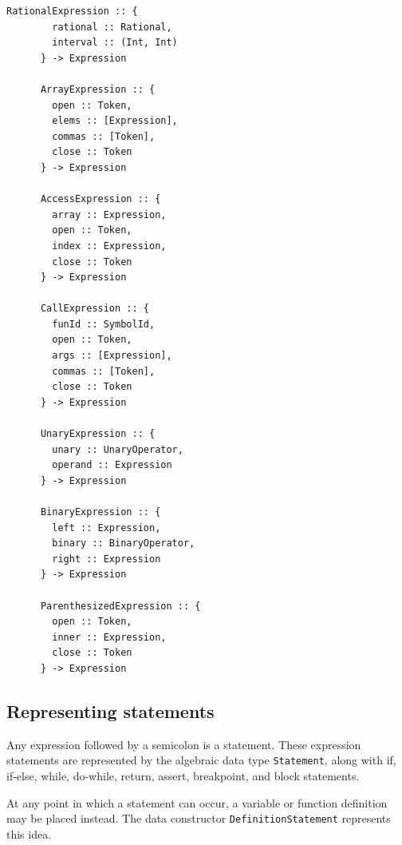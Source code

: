\documentclass[UdineBachThesis,american,11pt]{PhdThesis}
\begin{document}
  \begin{Verbatim}[gobble=4,fontsize=\small]
      RationalExpression :: {
        rational :: Rational,
        interval :: (Int, Int)
      } -> Expression

      ArrayExpression :: {
        open :: Token,
        elems :: [Expression],
        commas :: [Token],
        close :: Token
      } -> Expression

      AccessExpression :: {
        array :: Expression,
        open :: Token,
        index :: Expression,
        close :: Token
      } -> Expression

      CallExpression :: {
        funId :: SymbolId,
        open :: Token,
        args :: [Expression],
        commas :: [Token],
        close :: Token
      } -> Expression

      UnaryExpression :: {
        unary :: UnaryOperator,
        operand :: Expression
      } -> Expression

      BinaryExpression :: {
        left :: Expression,
        binary :: BinaryOperator,
        right :: Expression
      } -> Expression

      ParenthesizedExpression :: {
        open :: Token,
        inner :: Expression,
        close :: Token
      } -> Expression
  \end{Verbatim}

  \subsection{Representing statements}

  Any expression followed by a semicolon is a statement. These expression
  statements are represented by the algebraic data type
  \mbox{\texttt{Statement}}, along with if, if-else, while, do-while, return,
  assert, breakpoint, and block statements.

  \pagebreak

  At any point in which a statement can occur, a variable or function definition
  may be placed instead. The data constructor
  \mbox{\texttt{DefinitionStatement}} represents this idea.
\end{document}
